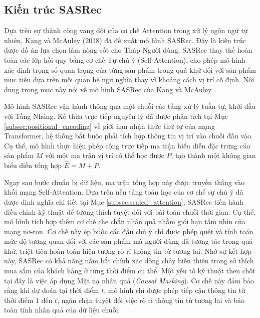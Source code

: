 \subsection{Kiến trúc SASRec}

Dựa trên sự thành công vang dội của cơ chế Attention trong xử lý ngôn ngữ tự nhiên, Kang và McAuley (2018) \cite{7} đã đề xuất mô hình SASRec. Đây là kiến trúc được đồ án lựa chọn làm nòng cốt cho Tháp Người dùng. SASRec thay thế hoàn toàn các lớp hồi quy bằng cơ chế Tự chú ý (Self-Attention), cho phép mô hình xác định trọng số quan trọng của từng sản phẩm trong quá khứ đối với sản phẩm mục tiêu dựa trên mối quan hệ ngữ nghĩa thay vì khoảng cách vị trí cố định. Nội dung trong mục này nói về mô hình SASRec của Kang và McAuley \cite{7}.

Mô hình SASRec vận hành thông qua một chuỗi các tầng xử lý tuần tự, khởi đầu với Tầng Nhúng. Kế thừa trực tiếp nguyên lý đã được phân tích tại Mục \ref{subsec:positional_encoding} về giới hạn nhận thức thứ tự của mạng Transformer, hệ thống bắt buộc phải tích hợp thông tin vị trí vào chuỗi đầu vào. Cụ thể, mô hình thực hiện phép cộng trực tiếp ma trận biểu diễn đặc trưng của sản phẩm $M$ với một ma trận vị trí có thể học được $P$, tạo thành một không gian biểu diễn tổng hợp $\hat{E} = M + P$.

Ngay sau bước chuẩn bị dữ liệu, ma trận tổng hợp này được truyền thẳng vào khối mạng Self-Attention. Dựa trên nền tảng toán học của cơ chế sự chú ý đã được định nghĩa chi tiết tại Mục \ref{subsec:scaled_attention}, SASRec tiến hành điều chỉnh kỹ thuật để tương thích tuyệt đối với bài toán chuỗi thời gian. Cụ thể, mô hình tích hợp thêm cơ chế che chắn nhân quả nhằm giới hạn tầm nhìn của mạng nơ-ron. Cơ chế này ép buộc các đầu chú ý chỉ được phép quét và tính toán mức độ tương quan đối với các sản phẩm mà người dùng đã tương tác trong quá khứ, triệt tiêu hoàn toàn hiện tượng rò rỉ thông tin từ tương lai. Nhờ sự kết hợp này, SASRec có khả năng nắm bắt chính xác dòng chảy biến thiên trong sở thích mua sắm của khách hàng ở từng thời điểm cụ thể. Một yếu tố kỹ thuật then chốt tại đây là việc áp dụng Mặt nạ nhân quả (\textit{Causal Masking}). Cơ chế này đảm bảo rằng khi dự đoán tại thời điểm $t$, mô hình chỉ được phép tiếp cận thông tin từ thời điểm $1$ đến $t$, ngăn chặn tuyệt đối việc rò rỉ thông tin từ tương lai và bảo toàn tính nhân quả của dữ liệu chuỗi.

